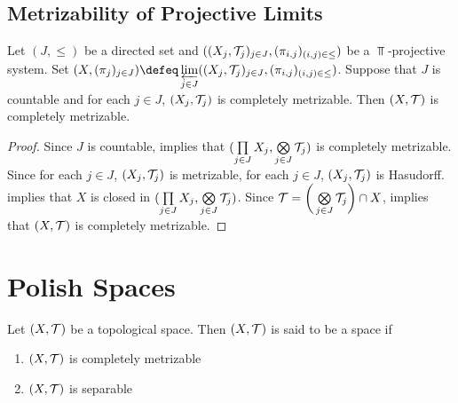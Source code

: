 \documentclass{book}
\begin{document}
\subsection{Metrizability of Projective Limits}

\begin{ex} 
	Let $(J, {\leq})$ be a directed set and $((X_j, \mathcal{T}_j)_{j \in J}, (\pi_{i,j})_{(i,j) \in {\leq}})$ be a $\Top$-projective system. Set $(X, (\pi_j)_{j \in J}) \defeq \varprojlim\limits_{j \in J} ((X_j, \MT_j)_{j \in J}, (\pi_{i,j})_{(i,j) \in {\leq}})$. Suppose that $J$ is countable and for each $j \in J$, $(X_j, \mathcal{T}_j)$ is completely metrizable. Then $(X, \mathcal{T})$ is completely metrizable.
\end{ex}

\begin{proof}
	Since $J$ is countable,  implies that $(\prod\limits_{j \in J} X_j, \bigotimes\limits_{j \in J} \mathcal{T}_j)$ is completely metrizable. Since for each $j \in J$, $(X_j, \mathcal{T}_j)$ is metrizable, for each $j \in J$, $(X_j, \mathcal{T}_j)$ is Hasudorff.  implies that $X$ is closed in $(\prod\limits_{j \in J} X_j, \bigotimes\limits_{j \in J} \mathcal{T}_j)$. Since $\mathcal{T} = \bigg( \bigotimes\limits_{j \in J} \mathcal{T}_j \bigg) \cap X$,  implies that $(X, \mathcal{T})$ is completely metrizable.
\end{proof}







































\newpage
\section{Polish Spaces}

\begin{defn} 
	Let $(X, \mathcal{T})$ be a topological space. Then $(X, \mathcal{T})$ is said to be a  space if 
	\begin{enumerate}
		\item $(X, \mathcal{T})$ is completely metrizable
		\item $(X, \mathcal{T})$ is separable
	\end{enumerate}
\end{defn}
\end{document}
